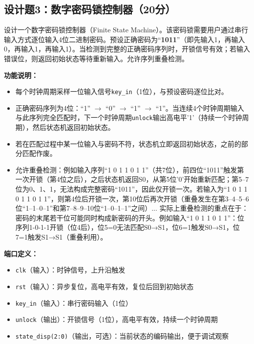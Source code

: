 \newpage

\subsection*{设计题3：数字密码锁控制器（20分）}

设计一个数字密码锁控制器（Finite State Machine）。该密码锁需要用户通过串行输入方式逐位输入4位二进制密码。预设正确密码为“\textbf{1011}”（即先输入1，再输入0，再输入1，再输入1）。当检测到完整的正确密码序列时，开锁信号有效；若输入错误位，则返回初始状态等待重新输入。允许序列重叠检测。

\vspace{0.3cm}

\textbf{功能说明：}
\begin{itemize}
  \item 每个时钟周期采样一位输入信号\texttt{key\_in}（1位），与预设密码逐位比对。
  \item 正确密码序列为4位：“1” $\to$ “0” $\to$ “1” $\to$ “1”。当连续4个时钟周期输入与此序列完全匹配时，下一个时钟周期\texttt{unlock}输出高电平'1'（持续一个时钟周期），然后状态机返回初始状态。
  \item 若在匹配过程中某一位输入与密码不符，状态机立即返回初始状态，之前的部分匹配作废。
  \item 允许重叠检测：例如输入序列“1 0 1 1 0 1 1”（共7位），前四位“1011”触发第一次开锁（第4位之后），之后状态机返回S0，从第5位'0'开始重新匹配；第5--7位为0、1、1，无法构成完整密码“1011”，因此仅开锁一次。若输入为“1 0 1 1 0 1 1 0 1 1”，则第4位后开锁一次，第10位后再次开锁（重叠发生在第3--4--5--6位“1--1--0--1”和第7--8--9--10位“1--0--1--1”之间）... 实际上重叠检测的重点在于：密码的末尾若干位可能同时构成新密码的开头。例如输入“1 0 1 1 0 1 1”：位序列1-0-1-1开锁（位4后），位5=0无法匹配S0→S1，位6=1触发S0→S1，位7=1触发S1→S1（重叠利用）。
\end{itemize}

\vspace{0.3cm}

\textbf{端口定义：}
\begin{itemize}
  \item \texttt{clk}（输入）：时钟信号，上升沿触发
  \item \texttt{rst}（输入）：异步复位，高电平有效，复位后回到初始状态
  \item \texttt{key\_in}（输入）：串行密码输入（1位）
  \item \texttt{unlock}（输出）：开锁信号（1位），高电平有效，持续一个时钟周期
  \item \texttt{state\_disp(2:0)}（输出，可选）：当前状态的编码输出，便于调试观察
\end{itemize}

